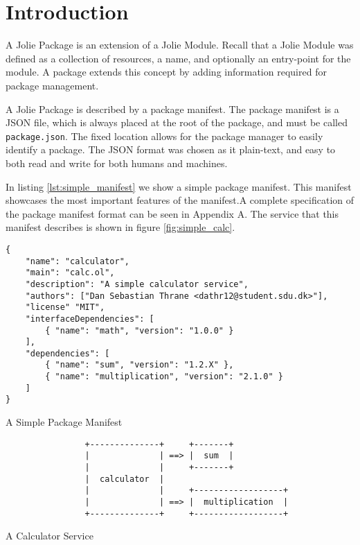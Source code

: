 \section{Introduction}

A Jolie Package is an extension of a Jolie Module. Recall that a Jolie Module
was defined as a collection of resources, a name, and optionally an entry-point
for the module. A package extends this concept by adding information required
for package management. %

A Jolie Package is described by a package manifest. The package manifest is a
JSON file, which is always placed at the root of the package, and must be
called \verb!package.json!. The fixed location allows for the package manager
to easily identify a package. The JSON format was chosen as it plain-text, and
easy to both read and write for both humans and machines.

In listing \ref{lst:simple_manifest} we show a simple package manifest. This
manifest showcases the most important features of the manifest.A complete
specification of the package manifest format can be seen in Appendix A. The
service that this manifest describes is shown in figure \ref{fig:simple_calc}.

\begin{listing}[H]
\begin{verbatim}
{
    "name": "calculator",
    "main": "calc.ol",
    "description": "A simple calculator service",
    "authors": ["Dan Sebastian Thrane <dathr12@student.sdu.dk>"],
    "license" "MIT",
    "interfaceDependencies": [
        { "name": "math", "version": "1.0.0" }
    ],
    "dependencies": [
        { "name": "sum", "version": "1.2.X" },
        { "name": "multiplication", "version": "2.1.0" }
    ]
}
\end{verbatim}
\caption{A Simple Package Manifest}
\label{lst:simple_manifest}
\end{listing}

\begin{listing}[H]
\begin{verbatim}
                +--------------+     +-------+
                |              | ==> |  sum  |
                |              |     +-------+
                |  calculator  |
                |              |     +------------------+
                |              | ==> |  multiplication  |
                +--------------+     +------------------+
\end{verbatim}
\caption{A Calculator Service}
\label{fig:simple_calc}
\end{listing}


